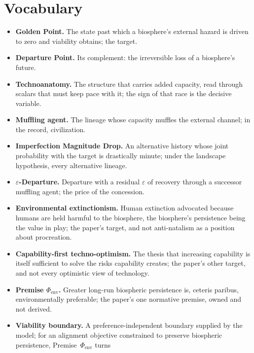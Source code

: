 \section{Vocabulary}\label{sec:vocab}
\begin{itemize}[itemsep=2pt]
\item \textbf{Golden Point.} The state past which a biosphere's external
hazard is driven to zero and viability obtains; the target.
\item \textbf{Departure Point.} Its complement: the irreversible loss of a
biosphere's future.
\item \textbf{Technoanatomy.} The structure that carries added capacity,
read through scalars that must keep pace with it; the sign of that race
is the decisive variable.
\item \textbf{Muffling agent.} The lineage whose capacity muffles the
external channel; in the record, civilization.
\item \textbf{Imperfection Magnitude Drop.} An alternative history whose
joint probability with the target is drastically minute; under the
landscape hypothesis, every alternative lineage.
\item \textbf{$\varepsilon$-Departure.} Departure with a residual
$\varepsilon$ of recovery through a successor muffling agent; the price
of the concession.
\item \textbf{Environmental extinctionism.} Human extinction advocated
because humans are held harmful to the biosphere, the biosphere's
persistence being the value in play; the paper's target, and not
anti-natalism as a position about procreation.
\item \textbf{Capability-first techno-optimism.} The thesis that
increasing capability is itself sufficient to solve the risks
capability creates; the paper's other target, and not every optimistic
view of technology.
\item \textbf{Premise $\Phi_{\mathrm{env}}$.} Greater long-run
biospheric persistence is, ceteris paribus, environmentally preferable;
the paper's one normative premise, owned and not derived.
\item \textbf{Viability boundary.} A preference-independent boundary
supplied by the model; for an alignment objective constrained to
preserve biospheric persistence, Premise~$\Phi_{\mathrm{env}}$ turns

\end{itemize}

